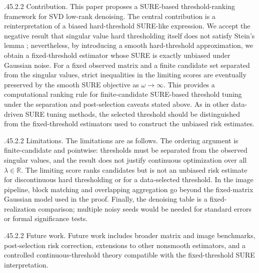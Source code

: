 \documentclass[12pt,reqno]{amsart}
\makeatletter
\numberwithin{equation}{section}
\def\paragraph{\@startsection{paragraph}{4}{\z@}%
  {.45\linespacing\@plus.2\linespacing}{.2\linespacing}%
  {\normalfont\bfseries}}
\theoremstyle{plain}
\theoremstyle{definition}
\newcommand{\R}{\mathbb{R}}
\makeatother
\begin{document}
\paragraph{Contribution.}
This paper proposes a SURE-based threshold-ranking framework for SVD low-rank denoising. The central contribution is a reinterpretation of a biased hard-threshold SURE-like expression. We accept the negative result that singular value hard thresholding itself does not satisfy Stein's lemma \cite{hansen2017comment}; nevertheless, by introducing a smooth hard-threshold approximation, we obtain a fixed-threshold estimator whose SURE is exactly unbiased under Gaussian noise. For a fixed observed matrix and a finite candidate set separated from the singular values, strict inequalities in the limiting scores are eventually preserved by the smooth SURE objective as $\omega\to\infty$. This provides a computational ranking rule for finite-candidate SURE-based threshold tuning under the separation and post-selection caveats stated above. As in other data-driven SURE tuning methods, the selected threshold should be distinguished from the fixed-threshold estimators used to construct the unbiased risk estimates.

\paragraph{Limitations.}
The limitations are as follows. The ordering argument is finite-candidate and pointwise: thresholds must be separated from the observed singular values, and the result does not justify continuous optimization over all $\lambda\in\R$. The limiting score ranks candidates but is not an unbiased risk estimate for discontinuous hard thresholding or for a data-selected threshold. In the image pipeline, block matching and overlapping aggregation go beyond the fixed-matrix Gaussian model used in the proof. Finally, the denoising table is a fixed-realization comparison; multiple noisy seeds would be needed for standard errors or formal significance tests.

\paragraph{Future work.}
Future work includes broader matrix and image benchmarks, post-selection risk correction, extensions to other nonsmooth estimators, and a controlled continuous-threshold theory compatible with the fixed-threshold SURE interpretation.
\end{document}

